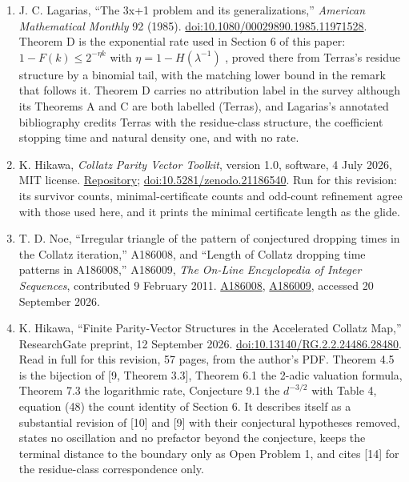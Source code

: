 \documentclass[11pt,a4paper]{article}
\begin{document}
\begin{enumerate}
  \(2.8395137305\) and Corollary 12 the exact normalized oscillation, as
  an envelope between \(1\) and \(2.7095112914\) attained on the record
  minima and maxima of \(\{r\log_23\}\) .
  \href{https://arxiv.org/abs/2609.22303}{arXiv:2609.22303}.
\item
  J. C. Lagarias, ``The 3x+1 problem and its generalizations,''
  \emph{American Mathematical Monthly} 92 (1985).
  \href{https://doi.org/10.1080/00029890.1985.11971528}{doi:10.1080/00029890.1985.11971528}.
  Theorem D is the exponential rate used in Section 6 of this paper:
  \(1-F(k)\le2^{-\eta k}\) with \(\eta=1-H(\lambda^{-1})\) , proved
  there from Terras's residue structure by a binomial tail, with the
  matching lower bound in the remark that follows it. Theorem D carries
  no attribution label in the survey although its Theorems A and C are
  both labelled (Terras), and Lagarias's annotated bibliography credits
  Terras with the residue-class structure, the coefficient stopping time
  and natural density one, and with no rate.
\item
  K. Hikawa, \emph{Collatz Parity Vector Toolkit}, version 1.0,
  software, 4 July 2026, MIT license.
  \href{https://github.com/hikawa94/Collatz-Parity-Vector-Toolkit}{Repository};
  \href{https://doi.org/10.5281/zenodo.21186540}{doi:10.5281/zenodo.21186540}.
  Run for this revision: its survivor counts, minimal-certificate counts
  and odd-count refinement agree with those used here, and it prints the
  minimal certificate length as the glide.
\item
  T. D. Noe, ``Irregular triangle of the pattern of conjectured dropping
  times in the Collatz iteration,'' A186008, and ``Length of Collatz
  dropping time patterns in A186008,'' A186009, \emph{The On-Line
  Encyclopedia of Integer Sequences}, contributed 9 February 2011.
  \href{https://oeis.org/A186008}{A186008},
  \href{https://oeis.org/A186009}{A186009}, accessed 20 September 2026.
\item
  K. Hikawa, ``Finite Parity-Vector Structures in the Accelerated
  Collatz Map,'' ResearchGate preprint, 12 September 2026.
  \href{https://doi.org/10.13140/RG.2.2.24486.28480}{doi:10.13140/RG.2.2.24486.28480}.
  Read in full for this revision, 57 pages, from the author's PDF.
  Theorem 4.5 is the bijection of {[}9, Theorem 3.3{]}, Theorem 6.1 the
  2-adic valuation formula, Theorem 7.3 the logarithmic rate, Conjecture
  9.1 the \(d^{-3/2}\) with Table 4, equation (48) the count identity of
  Section 6. It describes itself as a substantial revision of {[}10{]}
  and {[}9{]} with their conjectural hypotheses removed, states no
  oscillation and no prefactor beyond the conjecture, keeps the terminal
  distance to the boundary only as Open Problem 1, and cites {[}14{]}
  for the residue-class correspondence only.
\end{enumerate}
\end{document}
